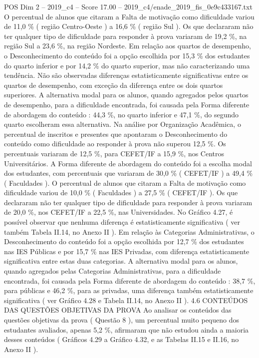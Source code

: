 \begin{textsample}{POS Dim 2 – 2019\_c4 – Score 17.00 – 2019\_c4/enade\_2019\_fis\_0e9c433167.txt}
O percentual de alunos que citaram a Falta de motivação como dificuldade variou de 11,0 \% ( região Centro-Oeste ) a 16,6 \% ( região Sul ).
Os que declararam não ter qualquer tipo de dificuldade para responder à prova variaram de 19,2 \%, na região Sul a 23,6 \%, na região Nordeste.
Em relação aos quartos de desempenho, o Desconhecimento do conteúdo foi a opção escolhida por 15,3 \% dos estudantes do quarto inferior e por 14,2 \% do quarto superior, mas não caracterizando uma tendência.
Não são observadas diferenças estatisticamente significativas entre os quartos de desempenho, com exceção da diferença entre os dois quartos superiores.
A alternativa modal para os alunos, quando agregados pelos quartos de desempenho, para a dificuldade encontrada, foi causada pela Forma diferente de abordagem do conteúdo : 44,3 \%, no quarto inferior e 47,1 \%, do segundo quarto escolheram essa alternativa.
Na análise por Organização Acadêmica, o percentual de inscritos e presentes que apontaram o Desconhecimento do conteúdo como dificuldade ao responder à prova não superou 12,5 \%.
Os percentuais variaram de 12,5 \%, para CEFET/IF a 15,9 \%, nos Centros Universitários.
A Forma diferente de abordagem do conteúdo foi a escolha modal dos estudantes, com percentuais que variaram de 30,0 \% ( CEFET/IF ) a 49,4 \% ( Faculdades ).
O percentual de alunos que citaram a Falta de motivação como dificuldade variou de 10,0 \% ( Faculdades ) a 27,5 \% ( CEFET/IF ).
Os que declararam não ter qualquer tipo de dificuldade para responder à prova variaram de 20,0 \%, nos CEFET/IF a 22,5 \%, nas Universidades.
No Gráfico 4.27, é possível observar que nenhuma diferença é estatisticamente significativa ( ver também Tabela II.14, no Anexo II ).
Em relação às Categorias Administrativas, o Desconhecimento do conteúdo foi a opção escolhida por 12,7 \% dos estudantes nas IES Públicas e por 15,7 \% nas IES Privadas, com diferença estatisticamente significativa entre estas duas categorias.
A alternativa modal para os alunos, quando agregados pelas Categorias Administrativas, para a dificuldade encontrada, foi causada pela Forma diferente de abordagem do conteúdo : 38,7 \%, para públicas e 46,2 \%, para as privadas, uma diferença também estatisticamente significativa ( ver Gráfico 4.28 e Tabela II.14, no Anexo II ). 4.6 CONTEÚDOS DAS QUESTÕES OBJETIVAS DA PROVA Ao analisar os conteúdos das questões objetivas da prova ( Questão 8 ), um percentual muito pequeno dos estudantes avaliados, apenas 5,2 \%, afirmaram que não estudou ainda a maioria desses conteúdos ( Gráficos 4.29 a Gráfico 4.32, e as Tabelas II.15 e II.16, no Anexo II ).

\end{textsample}
